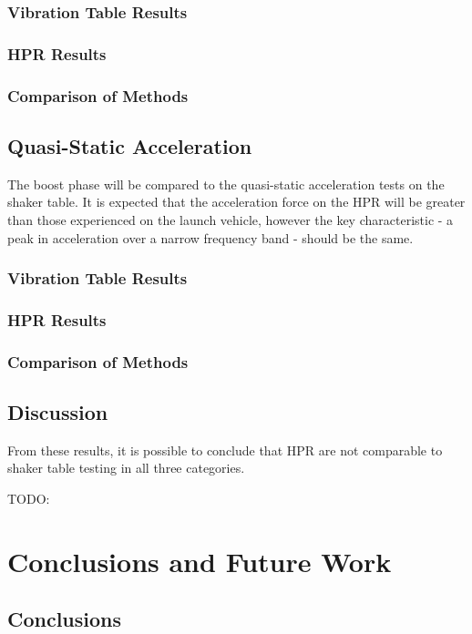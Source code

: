 \documentclass{report}
\begin{document}
\subsection{Vibration Table Results}
\subsection{HPR Results}
\subsection{Comparison of Methods}

\section{Quasi-Static Acceleration}
The boost phase will be compared to the quasi-static acceleration tests on the shaker table. It is expected that the acceleration force on the HPR will be greater than those experienced on the launch vehicle, however the key characteristic - a peak in acceleration over a narrow frequency band - should be the same.
\subsection{Vibration Table Results}
\subsection{HPR Results}
\subsection{Comparison of Methods}

\section{Discussion}

From these results, it is possible to conclude that HPR are not comparable to shaker table testing in all three categories.

TODO:

\chapter{Conclusions and Future Work}

\section{Conclusions}
\end{document}
